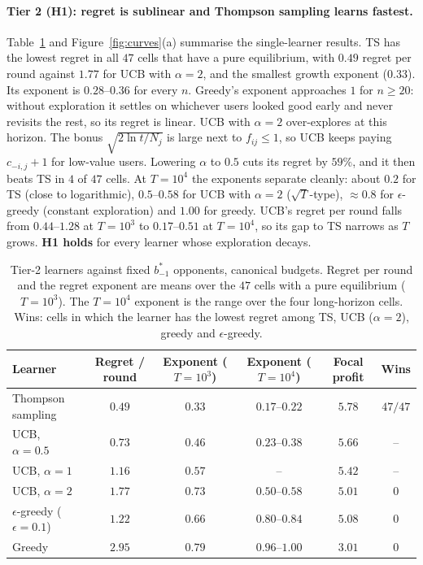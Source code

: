 \documentclass[11pt]{article}
\begin{document}
\paragraph{Tier 2 (H1): regret is sublinear and Thompson sampling learns fastest.}
Table~\ref{tab:t2} and Figure~\ref{fig:curves}(a) summarise the single-learner results. TS has the
lowest regret in all $47$ cells that have a pure equilibrium, with $0.49$ regret per round against
$1.77$ for UCB with $\alpha=2$, and the smallest growth exponent ($0.33$). Its exponent is $0.28$--$0.36$
for every $n$. Greedy's exponent approaches $1$ for $n\ge20$: without exploration it settles on whichever
users looked good early and never revisits the rest, so its regret is linear. UCB with $\alpha=2$
over-explores at this horizon. The bonus $\sqrt{2\ln t/N_j}$ is large next to $f_{ij}\le1$, so UCB keeps
paying $c_{-i,j}+1$ for low-value users. Lowering $\alpha$ to $0.5$ cuts its regret by $59\%$, and it
then beats TS in $4$ of $47$ cells.
At $T=10^4$ the exponents separate cleanly: about $0.2$ for TS (close to logarithmic), $0.5$--$0.58$ for UCB
with $\alpha=2$ ($\sqrt T$-type), $\approx0.8$ for $\epsilon$-greedy (constant exploration) and $1.00$
for greedy. UCB's regret per round falls from $0.44$--$1.28$ at $T=10^3$ to $0.17$--$0.51$ at $T=10^4$,
so its gap to TS narrows as $T$ grows. \textbf{H1 holds} for every learner whose exploration decays.

\begin{table}[t]
\centering\small
\caption{Tier-2 learners against fixed $b^*_{-1}$ opponents, canonical budgets. Regret per round and
the regret exponent are means over the $47$ cells with a pure equilibrium ($T=10^3$). The $T=10^4$
exponent is the range over the four long-horizon cells. Wins: cells in which the learner has the
lowest regret among TS, UCB ($\alpha=2$), greedy and $\epsilon$-greedy.}
\label{tab:t2}
\begin{tabular}{@{}lccccc@{}}
\toprule
Learner & Regret / round & Exponent ($T=10^3$) & Exponent ($T=10^4$) & Focal profit & Wins\\
\midrule
Thompson sampling & $\mathbf{0.49}$ & $\mathbf{0.33}$ & $\mathbf{0.17}$--$\mathbf{0.22}$ & $\mathbf{5.78}$ & $47/47$\\
UCB, $\alpha=0.5$ & $0.73$ & $0.46$ & $0.23$--$0.38$ & $5.66$ & --\\
UCB, $\alpha=1$ & $1.16$ & $0.57$ & -- & $5.42$ & --\\
UCB, $\alpha=2$ & $1.77$ & $0.73$ & $0.50$--$0.58$ & $5.01$ & $0$\\
$\epsilon$-greedy ($\epsilon=0.1$) & $1.22$ & $0.66$ & $0.80$--$0.84$ & $5.08$ & $0$\\
Greedy & $2.95$ & $0.79$ & $0.96$--$1.00$ & $3.01$ & $0$\\
\bottomrule
\end{tabular}
\end{table}
\end{document}
